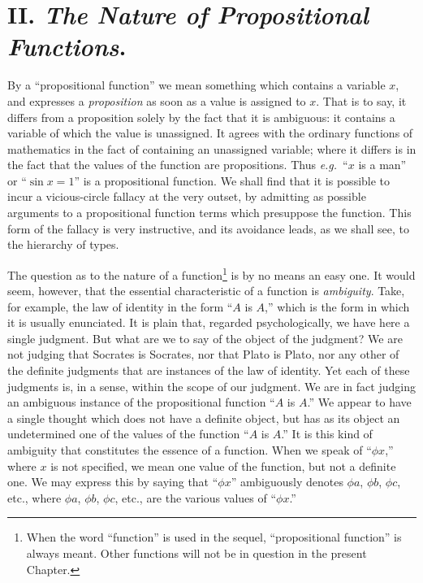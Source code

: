 \documentclass[letterpaper,12pt,openany,leqno]{book}
\newcommand{\pagefirst}[1]{\marginnote[\boxed{\text{#1}}]{\boxed{\text{#1}}}}
\begin{document}
\section*{\centering II. \textit{The Nature of Propositional Functions}.} \pagefirst{41} 

By a ``propositional function'' we mean something which contains a variable $x$, and expresses a \textit{proposition} as soon as a value is assigned to $x$. That is to say, it differs from a proposition solely by the fact that it is ambiguous: it contains a variable of which the value is unassigned. It agrees with the ordinary functions of mathematics in the fact of containing an unassigned variable; where it differs is in the fact that the values of the function are propositions. Thus \textit{e.g.}\ ``$x$ is a man'' or ``$\sin x = 1$'' is a propositional function. We shall find that it is possible to incur a vicious-circle fallacy at the very outset, by admitting as possible arguments to a propositional function terms which presuppose the function. This form of the fallacy is very instructive, and its avoidance leads, as we shall see, to the hierarchy of types.

The question as to the nature of a function\footnote{When the word ``function'' is used in the sequel, ``propositional function'' is always meant. Other functions will not be in question in the present Chapter.} is by no means an easy one. It would seem, however, that the essential characteristic of a function is \textit{ambiguity}. Take, for example, the law of identity in the form ``$A$ is $A$,'' which is the form in which it is usually enunciated. It is plain that, regarded psychologically, we have here a single judgment. But what are we to say of the object of the judgment? We are not judging that Socrates is Socrates, nor that Plato is Plato, nor any other of the definite judgments that are instances of the law of identity. Yet each of these judgments is, in a sense, within the scope of our judgment. We are in fact judging an ambiguous instance of the propositional function ``$A$ is $A$.'' We appear to have a single thought which does not have a definite object, but has as its object an undetermined one of the values of the function ``$A$ is $A$.'' It is this kind of ambiguity that constitutes the essence of a function. When we speak of ``$\phi x$,'' where $x$ is not specified, we mean one value of the function, but not a definite one. We may express this by saying that ``$\phi x$'' ambiguously denotes $\phi a$, $\phi b$, $\phi c$, etc., where $\phi a$, $\phi b$, $\phi c$, etc., are the various values of ``$\phi x$.'' 
\end{document}

